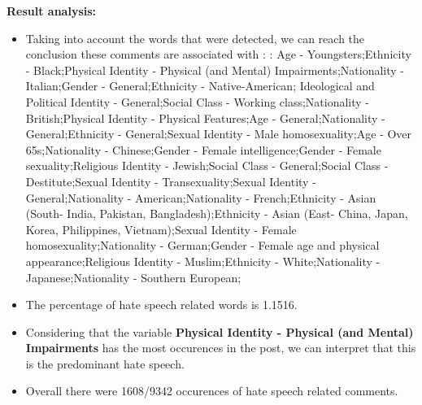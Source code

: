\documentclass[11pt]{article}
\newlength\mylength
\begin{document}
\begin{center}
\begin{longtable}{|C{.50\mylength}|C{.30\mylength}|C{.15\mylength}|C{.15\mylength}|C{.15\mylength}|}
\end{longtable}
\end{center}


\textbf{\Large Result analysis:}

\begin{itemize}\item Taking into account the words that were detected, we can reach the conclusion these comments are associated with : : Age - Youngsters;Ethnicity - Black;Physical Identity - Physical (and Mental) Impairments;Nationality - Italian;Gender - General;Ethnicity - Native-American; Ideological and Political Identity - General;Social Class - Working class;Nationality - British;Physical Identity - Physical Features;Age - General;Nationality - General;Ethnicity - General;Sexual Identity - Male homosexuality;Age - Over 65s;Nationality - Chinese;Gender - Female intelligence;Gender - Female sexuality;Religious Identity - Jewish;Social Class - General;Social Class - Destitute;Sexual Identity - Transexuality;Sexual Identity - General;Nationality - American;Nationality - French;Ethnicity - Asian (South- India, Pakistan, Bangladesh);Ethnicity - Asian (East- China, Japan, Korea, Philippines, Vietnam);Sexual Identity - Female homosexuality;Nationality - German;Gender - Female age and physical appearance;Religious Identity - Muslim;Ethnicity - White;Nationality - Japanese;Nationality - Southern European;%

\item The percentage of hate speech related words is 1.1516.

\item Considering that the variable \textbf{Physical Identity - Physical (and Mental) Impairments} has the most occurences in the post, we can interpret that this is the predominant hate speech.

\item Overall there were 1608/9342 occurences of hate speech related comments.\end{itemize}
\end{document}
